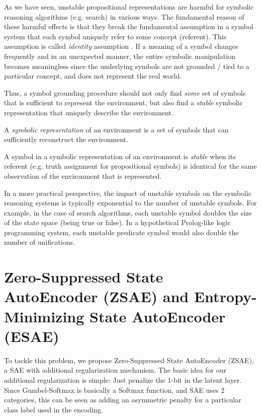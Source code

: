 As we have seen, unstable propositional representations are harmful for symbolic reasoning algorithms (e.g. search)
in various ways.
The fundamental reason of these harmful effects is that they break the fundamental assumption in a symbol system
that each symbol uniquely refer to some concept (referent). This assumption is called \emph{identity} assumption \cite{}.
If a meaning of a symbol changes frequently and in an unexpected manner, the entire symbolic manipulation becomes meaningless
since the underlying symbols are not grounded / tied to a particular concept, and does not represent the real world.

Thus, a symbol grounding procedure should not only find \emph{some} set of symbols that is sufficient to represent the
environment, but also find a \emph{stable} symbolic representation that uniquely describe the enviromnent.

\begin{defi}
A \emph{symbolic representation} of an environment is a set of symbols
that can sufficiently reconstruct the environment.
\end{defi}

\begin{defi}
A symbol in a symbolic representation of an environment is \emph{stable}
when its referent (e.g. truth assignment for propositional symbols) is identical
for the same observation of the environment that is represented.
\end{defi}

In a more practical perspective, 
the impact of unstable symbols on the symbolic reasoning systems is typically exponential to the number of unstable symbols.
For example, in the case of search algorithms, each unstable symbol doubles the size of the state space (being true or false).
In a hypothetical Prolog-like logic programming system, each unstable predicate symbol would also double the
number of unifications.


\section{Zero-Suppressed State AutoEncoder (ZSAE) and Entropy-Minimizing State AutoEncoder (ESAE)}
\label{zsae}

To tackle this problem, we propose Zero-Suppressed State AutoEncoder (ZSAE),
a SAE with additional regularization mechanism.
The basic idea for our additional regularization is simple: Just penalize the
1-bit in the latent layer. Since Gumbel-Softmax is basically a Softmax function,
and SAE uses 2 categories, this can be seen as adding an
asymmetric penalty for a particular class label used in the encoding.

